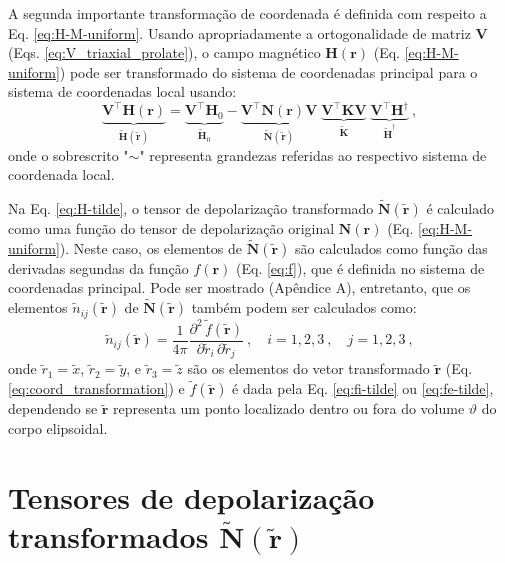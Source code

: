 A segunda importante transformação de coordenada é definida com respeito a Eq. \ref{eq:H-M-uniform}. Usando apropriadamente a ortogonalidade de matriz $\mathbf{V}$ (Eqs. \ref{eq:V_triaxial_prolate}),
o campo magnético $\mathbf{H}(\mathbf{r})$ (Eq. \ref{eq:H-M-uniform}) pode ser transformado do sistema de coordenadas principal para o sistema de coordenadas local usando:
\begin{equation}
\underbrace{\mathbf{V}^{\top} \mathbf{H}(\mathbf{r})}_{\tilde{\mathbf{H}}(\tilde{\mathbf{r}})} = 
\underbrace{\mathbf{V}^{\top} \mathbf{H}_{0}}_{\tilde{\mathbf{H}}_{0}}
- \underbrace{\mathbf{V}^{\top} \mathbf{N}(\mathbf{r}) \mathbf{V}}
_{\tilde{\mathbf{N}}(\tilde{\mathbf{r}})} \;
\underbrace{\mathbf{V}^{\top} \mathbf{K} \mathbf{V}}
_{\tilde{\mathbf{K}}} \; 
\underbrace{\mathbf{V}^{\top} \mathbf{H}^{\dagger}}
_{\tilde{\mathbf{H}}^{\dagger}} \: ,
\label{eq:H-tilde}
\end{equation}
onde o sobrescrito "$\sim$" representa grandezas referidas ao respectivo sistema de coordenada local.

Na Eq. \ref{eq:H-tilde}, o tensor de depolarização transformado $\tilde{\mathbf{N}}(\tilde{\mathbf{r}})$ é calculado como uma função do tensor de depolarização original $\mathbf{N}(\mathbf{r})$ (Eq. \ref{eq:H-M-uniform}). Neste caso, os elementos de $\tilde{\mathbf{N}}(\tilde{\mathbf{r}})$ são calculados como função das derivadas segundas da função $f(\mathbf{r})$ (Eq. \ref{eq:f}), que é definida no  sistema de coordenadas principal. Pode ser mostrado (Apêndice A), entretanto, que os elementos $\tilde{n}_{ij}(\tilde{\mathbf{r}})$ de
$\tilde{\mathbf{N}}(\tilde{\mathbf{r}})$ também podem ser calculados como:
\begin{equation}
\tilde{n}_{ij}(\tilde{\mathbf{r}}) = 
\frac{1}{4\pi} \frac{\partial^{2} \, \tilde{f}(\tilde{\mathbf{r}})}
{\partial \tilde{r}_{i} \, \partial \tilde{r}_{j}} 
\: , \quad i = 1, 2, 3 \: , \quad j = 1, 2, 3 \: ,
\label{eq:nij-tilde}
\end{equation}
onde $\tilde{r}_{1} = \tilde{x}$, $\tilde{r}_{2} = \tilde{y}$, 
e $\tilde{r}_{3} = \tilde{z}$ são os elementos do vetor transformado $\tilde{\mathbf{r}}$ (Eq. \ref{eq:coord_transformation})
e $\tilde{f}(\tilde{\mathbf{r}})$ é dada pela Eq. \ref{eq:fi-tilde}
ou \ref{eq:fe-tilde}, dependendo se $\tilde{\mathbf{r}}$ representa um ponto localizado dentro ou fora do volume $\vartheta$ do corpo elipsoidal.

\section{Tensores de depolarização transformados $\tilde{\mathbf{N}}(\tilde{\mathbf{r}})$}

